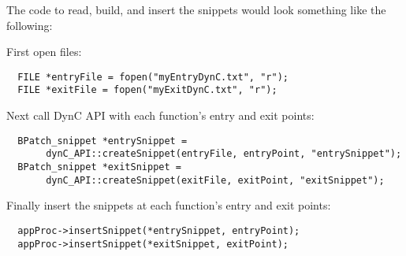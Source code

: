 \documentclass{article}
\begin{document}

\noindent The code to read, build, and insert the snippets would look something like the following:

\noindent First open files:
\begin{lstlisting}
  FILE *entryFile = fopen("myEntryDynC.txt", "r");
  FILE *exitFile = fopen("myExitDynC.txt", "r");
\end{lstlisting}

\noindent Next call DynC API with each function's entry and exit points:
\begin{lstlisting}
  BPatch_snippet *entrySnippet = 
       dynC_API::createSnippet(entryFile, entryPoint, "entrySnippet");
  BPatch_snippet *exitSnippet = 
       dynC_API::createSnippet(exitFile, exitPoint, "exitSnippet");
\end{lstlisting}

\noindent Finally insert the snippets at each function's entry and exit points:
\begin{lstlisting}
  appProc->insertSnippet(*entrySnippet, entryPoint);
  appProc->insertSnippet(*exitSnippet, exitPoint);
\end{lstlisting}

\begin{comment}
\begin{lstlisting}
/*** Create Snippet ***/
// build entryString
std::stringstream entryString;
entryString << "static int intCounter;" << endl;
entryString << "printf(\"Entering %s, which has been called %d times.\\n\"";
entryString << ",dyninst`function_name, intCounter);";

// call to DynC API
BPatch_snippet *entrySnippet = 
       dynC_API::createSnippet(entryString.str().c_str(), entryPoint, "entrySnippet");

// build exitString
std::stringstream exitString;
exitString << "printf(\"Exiting %s.\\n\", dyninst`function_name);";

// call to DynC API
BPatch_snippet *exitSnippet = 
       dynC_API::createSnippet(exitString.str().c_str(), app, "exitSnippet");
/*** Finish Snippet ***/

// find all entry and exit points
std::vector<BPatch_point *> * entry_points = (*functions)[0]->findPoint(BPatch_entry);
std::vector<BPatch_point *> * exit_points = (*functions)[0]->findPoint(BPatch_exit);

for(unsigned int i = 1; i < functions->size(); i++){
  entry_points->push_back((*(*functions)[i]->findPoint(BPatch_entry))[0]);
  exit_points->push_back((*(*functions)[i]->findPoint(BPatch_exit))[0]);
}

// insert Snippets
appProc->insertSnippet(*entrySnippet, entry_points);
appProc->insertSnippet(*exitSnippet, exit_points);
  
//run mutatee
appProc->continueExecution();

\end{lstlisting}
\end{comment}
\end{document}
